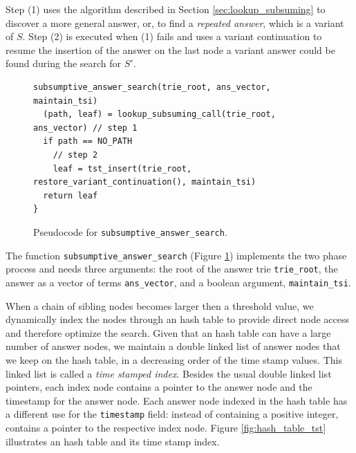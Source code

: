 Step (1) uses the algorithm described in Section \ref{sec:lookup_subsuming} to discover a more general answer, or,
to find a \textit{repeated answer}, which is a variant of $S$.
Step (2) is executed when (1) fails and uses a variant continuation to resume the insertion of the answer
on the last node a variant answer could be found during the search for $S'$.

\begin{figure}[ht]
\begin{Verbatim}[fontsize=\small]
subsumptive_answer_search(trie_root, ans_vector, maintain_tsi)
  (path, leaf) = lookup_subsuming_call(trie_root, ans_vector) // step 1
  if path == NO_PATH
    // step 2
    leaf = tst_insert(trie_root, restore_variant_continuation(), maintain_tsi)
  return leaf
}
\end{Verbatim}
\caption{Pseudo\-code for \texttt{subsumptive\_answer\_search}.}
\label{fig:subsumptive_answer_search}
\end{figure}

The function \texttt{subsumptive\_answer\_search} (Figure \ref{fig:subsumptive_answer_search})
implements the two phase process and needs three arguments: the root of the answer trie \texttt{trie\_root},
the answer as a vector of terms \texttt{ans\_vector}, and a boolean argument, \texttt{maintain\_tsi}.

When a chain of sibling nodes becomes larger then a threshold value, we dynamically index the nodes through an hash table to provide direct node access and therefore optimize the search. Given that an hash table
can have a large number of answer nodes, we maintain a double linked list of answer nodes that we keep on the hash
table, in a decreasing order of the time stamp values. This linked list is called a \textit{time stamped index}.
Besides the usual double linked list pointers, each index node contains a pointer to the answer node
and the timestamp for the answer node. Each answer node indexed in the hash table has a different use
for the \texttt{timestamp} field: instead of containing a positive integer, contains a pointer to the respective index node. Figure \ref{fig:hash_table_tst} illustrates an hash table and its time stamp index.

